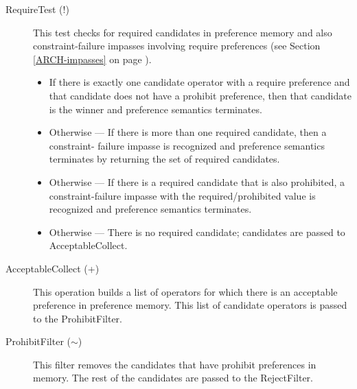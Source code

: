 \begin{description}
	\item[RequireTest (!)]
		This test checks for required candidates in preference memory and also constraint-failure impasses involving require preferences (see Section \ref{ARCH-impasses} on page \pageref{ARCH-impasses}).
	
	\begin{itemize}
		\item If there is exactly one candidate operator with a require preference and
		that candidate does not have a prohibit preference, then that candidate
		is the winner and preference semantics terminates.
		\item Otherwise ---
		If there is more than one required candidate, then a constraint-
		failure impasse is recognized and preference semantics terminates 
		by returning the set of required candidates.
		\item Otherwise ---
		If there is a required candidate that is also prohibited, a
		constraint-failure impasse with the required/prohibited value is
		recognized and preference semantics terminates.
		\item Otherwise ---
		There is no required candidate; candidates are passed to AcceptableCollect.
	\end{itemize}
	
	\index{+}
	\item[AcceptableCollect (+) ]
		This operation builds a list of operators for which there is an acceptable preference in preference memory. This list of candidate operators is passed to the ProhibitFilter.
	
	\item[ProhibitFilter ($\sim$) ] This filter removes the candidates that have prohibit preferences in memory. The rest of the candidates are passed to the RejectFilter.
	

\end{description}

